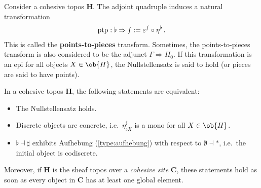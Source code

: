 
    \begin{property}[Nullstellensatz]
        Consider a cohesive topos $\mathbf{H}$. The adjoint quadruple induces a natural transformation
        \begin{gather*}
            \mathrm{ptp}:\flat\Rightarrow\smallint := \varepsilon^{\smallint}\circ\eta^\flat\,.
        \end{gather*}
        This is called the \textbf{points-to-pieces} transform. Sometimes, the points-to-pieces transform is also considered to be the adjunct $\Gamma\Rightarrow\Pi_0$. If this transformation is an epi for all objects $X\in\ob{H}$, the Nullstellensatz is said to hold (or pieces are said to have points).
    \end{property}
    \begin{property}\label{topos:nullstellensatz}
        In a cohesive topos $\mathbf{H}$, the following statements are equivalent:
        \begin{itemize}
            \item The Nullstellensatz holds.
            \item Discrete objects are concrete, i.e.~$\eta^\sharp_{\flat X}$ is a mono for all $X\in\ob{H}$.
            \item $\flat\dashv\sharp$ exhibits Aufhebung (\cref{type:aufhebung}) with respect to $\emptyset\dashv\ast$, i.e.~the initial object is codiscrete.
        \end{itemize}
        Moreover, if $\mathbf{H}$ is the sheaf topos over a \textit{cohesive site} $\mathbf{C}$, these statements hold as soon as every object in $\mathbf{C}$ has at least one global element.
    \end{property}

